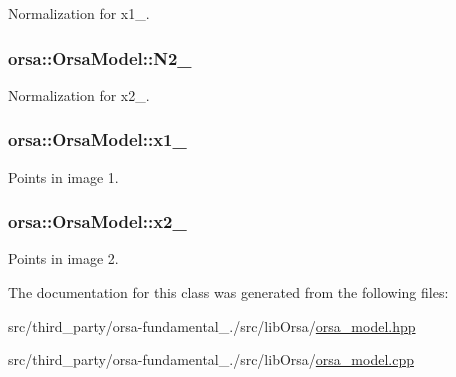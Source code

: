 Normalization for x1\+\_\+. 

\hypertarget{classorsa_1_1OrsaModel_aa94cb453d88889164c75bb73edee6ebe}{}
\subsubsection[{N2\+\_\+}]{ orsa\+::\+Orsa\+Model\+::\+N2\+\_\+\hspace{0.3cm}{\ttfamily [protected]}}\label{classorsa_1_1OrsaModel_aa94cb453d88889164c75bb73edee6ebe}


Normalization for x2\+\_\+. 

\hypertarget{classorsa_1_1OrsaModel_ab910d0735b9df04f62e76f2ba9a5f422}{}
\subsubsection[{x1\+\_\+}]{ orsa\+::\+Orsa\+Model\+::x1\+\_\+\hspace{0.3cm}{\ttfamily [protected]}}\label{classorsa_1_1OrsaModel_ab910d0735b9df04f62e76f2ba9a5f422}


Points in image 1. 

\hypertarget{classorsa_1_1OrsaModel_afbc2fa3dd7b4403dbc8779491c2a0de2}{}
\subsubsection[{x2\+\_\+}]{ orsa\+::\+Orsa\+Model\+::x2\+\_\+\hspace{0.3cm}{\ttfamily [protected]}}\label{classorsa_1_1OrsaModel_afbc2fa3dd7b4403dbc8779491c2a0de2}


Points in image 2. 



The documentation for this class was generated from the following files\+:\begin{DoxyCompactItemize}
\item 
src/third\+\_\+party/orsa-\/fundamental\+\_./src/lib\+Orsa/\hyperlink{orsa__model_8hpp}{orsa\+\_\+model.\+hpp}\item 
src/third\+\_\+party/orsa-\/fundamental\+\_./src/lib\+Orsa/\hyperlink{orsa__model_8cpp}{orsa\+\_\+model.\+cpp}\end{DoxyCompactItemize}
